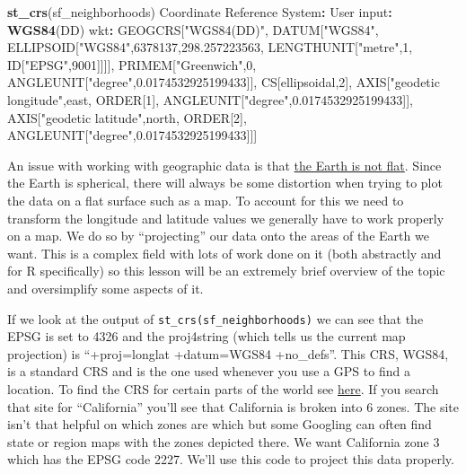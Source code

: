 \documentclass[
  12pt,
]{book}
\newenvironment{Shaded}{\begin{snugshade}}{\end{snugshade}}
\newcommand{\DecValTok}[1]{\textcolor[rgb]{0.06,0.06,0.06}{#1}}
\newcommand{\FloatTok}[1]{\textcolor[rgb]{0.06,0.06,0.06}{#1}}
\newcommand{\KeywordTok}[1]{\textcolor[rgb]{0.27,0.27,0.27}{\textbf{#1}}}
\newcommand{\NormalTok}[1]{#1}
\newcommand{\OperatorTok}[1]{\textcolor[rgb]{0.43,0.43,0.43}{\textbf{#1}}}
\newcommand{\StringTok}[1]{\textcolor[rgb]{0.5,0.5,0.5}{#1}}
\begin{document}
\begin{Shaded}
\begin{Highlighting}[]
\KeywordTok{st\_crs}\NormalTok{(sf\_neighborhoods)}
\NormalTok{Coordinate Reference System}\OperatorTok{:}
\StringTok{  }\NormalTok{User input}\OperatorTok{:}\StringTok{ }\KeywordTok{WGS84}\NormalTok{(DD) }
\NormalTok{  wkt}\OperatorTok{:}
\NormalTok{GEOGCRS[}\StringTok{"WGS84(DD)"}\NormalTok{,}
\NormalTok{    DATUM[}\StringTok{"WGS84"}\NormalTok{,}
\NormalTok{        ELLIPSOID[}\StringTok{"WGS84"}\NormalTok{,}\DecValTok{6378137}\NormalTok{,}\FloatTok{298.257223563}\NormalTok{,}
\NormalTok{            LENGTHUNIT[}\StringTok{"metre"}\NormalTok{,}\DecValTok{1}\NormalTok{,}
\NormalTok{                ID[}\StringTok{"EPSG"}\NormalTok{,}\DecValTok{9001}\NormalTok{]]]],}
\NormalTok{    PRIMEM[}\StringTok{"Greenwich"}\NormalTok{,}\DecValTok{0}\NormalTok{,}
\NormalTok{        ANGLEUNIT[}\StringTok{"degree"}\NormalTok{,}\FloatTok{0.0174532925199433}\NormalTok{]],}
\NormalTok{    CS[ellipsoidal,}\DecValTok{2}\NormalTok{],}
\NormalTok{        AXIS[}\StringTok{"geodetic longitude"}\NormalTok{,east,}
\NormalTok{            ORDER[}\DecValTok{1}\NormalTok{],}
\NormalTok{            ANGLEUNIT[}\StringTok{"degree"}\NormalTok{,}\FloatTok{0.0174532925199433}\NormalTok{]],}
\NormalTok{        AXIS[}\StringTok{"geodetic latitude"}\NormalTok{,north,}
\NormalTok{            ORDER[}\DecValTok{2}\NormalTok{],}
\NormalTok{            ANGLEUNIT[}\StringTok{"degree"}\NormalTok{,}\FloatTok{0.0174532925199433}\NormalTok{]]]}
\end{Highlighting}
\end{Shaded}

An issue with working with geographic data is that \href{https://en.wikipedia.org/wiki/Spherical_Earth}{the Earth is not flat}. Since the Earth is spherical, there will always be some distortion when trying to plot the data on a flat surface such as a map. To account for this we need to transform the longitude and latitude values we generally have to work properly on a map. We do so by ``projecting'' our data onto the areas of the Earth we want. This is a complex field with lots of work done on it (both abstractly and for R specifically) so this lesson will be an extremely brief overview of the topic and oversimplify some aspects of it.

If we look at the output of \texttt{st\_crs(sf\_neighborhoods)} we can see that the EPSG is set to 4326 and the proj4string (which tells us the current map projection) is ``+proj=longlat +datum=WGS84 +no\_defs''. This CRS, WGS84, is a standard CRS and is the one used whenever you use a GPS to find a location. To find the CRS for certain parts of the world see \href{https://spatialreference.org/}{here}. If you search that site for ``California'' you'll see that California is broken into 6 zones. The site isn't that helpful on which zones are which but some Googling can often find state or region maps with the zones depicted there. We want California zone 3 which has the EPSG code 2227. We'll use this code to project this data properly.
\end{document}

